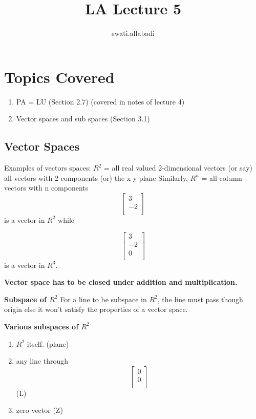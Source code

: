 \documentclass{article}
\title{LA Lecture 5}
\author{swati.allabadi }
\begin{document}
\maketitle

\section{Topics Covered}
\begin{enumerate}
    \item  PA = LU (Section 2.7) (covered in notes of lecture 4)
    \item  Vector spaces and sub spaces (Section 3.1) 
\end{enumerate}

\subsection{Vector Spaces}
Examples of vectors spaces: \newline
$R^2$ = all real valued 2-dimensional vectors (or say) all vectors with 2 components (or)  the x-y plane \newline
Similarly, $R^n$ = all column vectors with n components
\[
\begin{bmatrix}
3 \\
-2\\
\end{bmatrix}
\] is a vector in $R^2$ while 

\[
\begin{bmatrix}
3 \\
-2\\
0\\
\end{bmatrix}
\] is a vector in $R^3$.

\textbf{Vector space has to be closed under addition and multiplication.}

\textbf{Subspace of $R^2$} %
For a line to be subspace in $R^2$, the line must pass though origin else it won't satisfy the properties of a vector space.

\newline
\textbf{Various subspaces of $R^2$}
\begin{enumerate}
    \item $R^2$ itself. (plane)
    \item any line through \[
\begin{bmatrix}
0\\
0\\
\end{bmatrix}
\] (L)
    \item zero vector (Z)
\end{enumerate}
\end{document}
